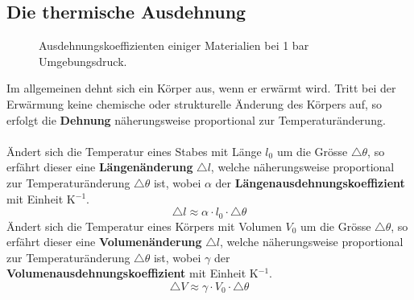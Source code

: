 \subsection{Die thermische Ausdehnung}
\begin{figure}[H]
\centering
\caption{Ausdehnungskoeffizienten einiger Materialien bei 1 bar Umgebungsdruck.}
\label{fig_Id}
\end{figure}
\noindent Im allgemeinen dehnt sich ein Körper aus, wenn er erwärmt wird. Tritt bei der Erwärmung keine chemische oder strukturelle Änderung des Körpers auf, so erfolgt die \textbf{Dehnung} näherungsweise proportional zur Temperaturänderung. 
\\\\
Ändert sich die Temperatur eines Stabes mit Länge $l_0$ um die Grösse $\triangle \theta$, so erfährt dieser eine \textbf{Längenänderung} $\triangle l$, welche näherungsweise proportional zur Temperaturänderung $\triangle \theta$ ist, wobei $\alpha$ der \textbf{Längenausdehnungskoeffizient} mit Einheit K$^{-1}$.
\begin{equation}
\boxed{\triangle l\approx \alpha\cdot l_0\cdot \triangle \theta}
\end{equation}
Ändert sich die Temperatur eines Körpers mit Volumen $V_0$ um die Grösse $\triangle \theta$, so erfährt dieser eine \textbf{Volumenänderung} $\triangle l$, welche näherungsweise proportional zur Temperaturänderung $\triangle \theta$ ist, wobei $\gamma$ der \textbf{Volumenausdehnungskoeffizient} mit Einheit K$^{-1}$.
\begin{equation}
\boxed{\triangle V\approx \gamma\cdot V_0\cdot \triangle \theta}
\end{equation}
